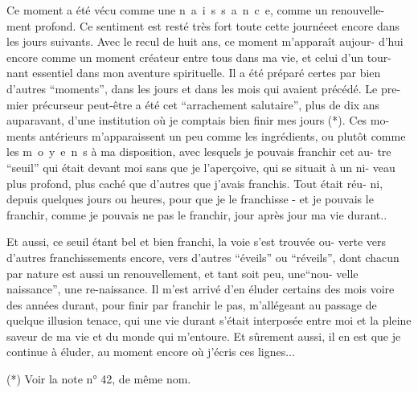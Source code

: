 Ce moment a été vécu comme une \mbox{n a i s s a n c e}, comme un renouvelle-\linebreak
ment profond. Ce sentiment est resté très fort toute cette journée\inserted{,}et encore
dans les jours suivants. Avec le recul de huit ans, ce moment m'apparaît aujour-\linebreak
d'hui encore comme un moment créateur entre tous dans ma vie, et celui d'un tour-\linebreak
nant essentiel dans mon aventure spirituelle. Il a été préparé certes par bien
d'autres ``moments'', dans les jours et dans les mois qui avaient précédé. Le pre-\linebreak
mier précurseur peut-être a été cet ``arrachement salutaire'', plus de dix ans
auparavant, d'une institution où je comptais bien finir mes jours (*). Ces mo-\linebreak
ments antérieurs m'apparaissent un peu comme les ingrédients, ou plutôt comme
les \mbox{m o y e n s} à ma disposition, avec lesquels je pouvais franchir cet au-\linebreak
tre ``seuil'' qui était devant moi sans que je l'aperçoive, qui se situait à un ni-\linebreak
veau plus profond, plus caché que d'autres que j'avais franchis. Tout était réu-\linebreak
ni, depuis quelques jours ou heures, pour que je le franchisse - et je pouvais
le franchir, comme je pouvais ne pas le franchir, jour après jour ma vie durant..

Et aussi, ce seuil étant bel et bien franchi, la voie s'est trouvée ou-\linebreak
verte vers d'autres franchissements encore, vers d'autres ``éveils'' ou ``réveils'',
dont chacun par nature est aussi un renouvellement, et tant soit peu, une\unsure{:}``nou-\linebreak
velle naissance'', une re-naissance. Il m'est arrivé d'en éluder certains des mois
voire des années durant, pour finir par franchir le pas, m'allégeant au passage
de quelque illusion tenace, qui une vie durant s'était interposée entre moi et
la pleine saveur de ma vie et du monde qui m'entoure. Et sûrement aussi, il en
est que je continue à éluder, au moment encore où j'écris ces lignes...

(*) Voir la note n° 42, de même nom.

